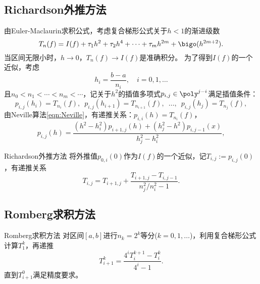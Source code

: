 \subsection{Richardson外推方法}


由Euler-Maclaurin求积公式，考虑复合梯形公式关于$h<1$的渐进级数
\[
    T_n(f)=I(f)+\tau_1h^2+\tau_2h^4+\cdots+\tau_mh^{2m}+\bigo(h^{2m+2}).
\]
当区间无限小时，$h\to0$，$T_n(f)\to I(f)$是准确积分。
为了得到$I(f)$的一个近似，考虑
\[
    h_i=\frac{b-a}{n_i},\quad i=0,1,\ldots
\]
且$n_0<n_1<\cdots<n_m<\cdots$，记关于$h^2$的插值多项式$p_{i,j}\in\poly^{j-i}$满足插值条件：
\[
    p_{i,j}(h_i)=T_{n_i}(f),\enspace
    p_{i,j}(h_{i+1})=T_{n_{i+1}}(f),\enspace
    \ldots,\enspace
    p_{i,j}(h_j)=T_{n_j}(f),
\]
由Neville算法\eqref{eqn:Neville}，有递推关系：$p_{i,i}(h)=T_{n_i}(f)$，
\[
    p_{i,j}(h)=\frac{(h^2-h_i^2)p_{i+1,j}(h)+(h_j^2-h^2)p_{i,j-1}(x)}{h_j^2-h_i^2},
\]

\begin{theorem}
    {Richardson外推方法}{}
    将外推值$p_{0,i}(0)$作为$I(f)$的一个近似，记$T_{i,j}:=p_{i,j}(0)$，有递推关系
    \begin{equation}
        \label{eqn:Richardson}
        T_{i,j}=T_{i+1,j}+\frac{T_{i+1,j}-T_{i,j-1}}{n_j^2/n_i^2-1}.
    \end{equation}
\end{theorem}

\subsection{Romberg求积方法}

\begin{theorem}
    {Romberg求积方法}{}
    对区间$[a,b]$进行$n_k=2^k$等分($k=0,1,\ldots$)，利用复合梯形公式计算$T_1^k$，再递推
    \begin{equation}
        T_{i+1}^k=\frac{4^iT_i^{k+1}-T_i^k}{4^i-1}.
    \end{equation}
    直到$T_{i+1}^0$满足精度要求。
\end{theorem}

